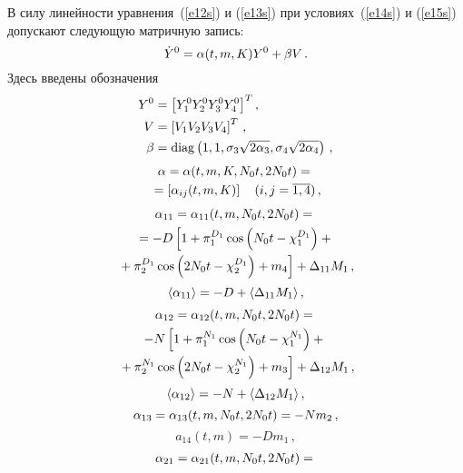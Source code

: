 \begin{multicols}{2}
В силу линейности уравнения~(\ref{e12s}) и (\ref{e13s}) при
условиях~(\ref{e14s}) и (\ref{e15s})
допускают следующую матричную запись:
\begin{equation}
\dot Y^0 = \alpha(t,m, K) Y^0 + \beta V\,.\label{e16s}
\end{equation}
Здесь введены обозначения
 \begin{align*}
 Y^0 &=\left[ Y_1^0Y_2^0Y_3^0Y_4^0\right]^T,\\
 V&=\left[ V_1 V_2 V_3 V_4\right]^T\,,%
\\
\beta &= \mathrm{diag} \left( 1,1, \si_3 \sqrt{2\alp_3} , \si_4\sqrt{2\alp_4}\right)\,,
\end{align*}
\begin{multline*}
 \alpha =\alpha(t, m,K, N_0t, 2N_0t) ={}\\
{}=\left[ \alpha_{ij} (t, m,K)\right]\quad (i,j=\overline{1,4})\,,
\end{multline*}
\begin{multline*}
 \alpha_{11}  =\alpha_{11} (t,m, N_0t, 2N_0t)= {}\\
{}=- D \left[ 1+\pi_1^{D_1} \cos \left(N_0t  -\chi_1^{D_1}\right)+{}\right.\\
\left.{}+ \pi_2^{D_1} \cos \left(2N_0t -\chi_2^{D_1}\right)+m_4\right]+\Delta_{11}M_1\,,
\end{multline*}
\begin{equation*}
 \langle \alpha_{11} \rangle=-D+\langle\Delta_{11}M_1\rangle\,,
\end{equation*}
\begin{multline*}
 \alpha_{12} =\alpha_{12} (t,m, N_0t, 2N_0t)={}\\
 - N \left[ 1+\pi_1^{N_1} \cos \left(N_0t -\chi_1^{N_1}\right)+{}\right.\\
\left.{} + \pi_2^{N_1} \cos \left(2N_0t -\chi_2^{N_1}\right)+ m_3\right]+\Delta_{12}M_1\,,
\end{multline*}
\begin{equation*}
 \langle\alpha_{12}\rangle =-N +\langle\Delta_{12}M_1\rangle\,,
\end{equation*}
\begin{equation*}
 \alpha_{13}  =\alpha_{13} (t, m, N_0t, 2N_0t) = - N m_2\,,
\end{equation*}
\begin{equation*}
a_{14} (t, m) = - D m_1\,,
\end{equation*}
\begin{multline*}
 \alp_{21} =\alp_{21} (t, m, N_0t, 2N_0t)= {}\\

\end{multline*}
\end{multicols}

